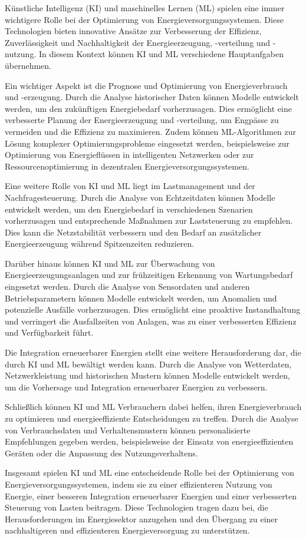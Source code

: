 Künstliche Intelligenz (KI) und maschinelles Lernen (ML) spielen eine immer
wichtigere Rolle bei der Optimierung von Energieversorgungssystemen. Diese
Technologien bieten innovative Ansätze zur Verbesserung der Effizienz,
Zuverlässigkeit und Nachhaltigkeit der Energieerzeugung, -verteilung und
-nutzung. In diesem Kontext können KI und ML verschiedene Hauptaufgaben
übernehmen.

Ein wichtiger Aspekt ist die Prognose und Optimierung von Energieverbrauch und
-erzeugung. Durch die Analyse historischer Daten können Modelle entwickelt
werden, um den zukünftigen Energiebedarf vorherzusagen. Dies ermöglicht eine
verbesserte Planung der Energieerzeugung und -verteilung, um Engpässe zu
vermeiden und die Effizienz zu maximieren. Zudem können ML-Algorithmen zur
Lösung komplexer Optimierungsprobleme eingesetzt werden, beispielsweise zur
Optimierung von Energieflüssen in intelligenten Netzwerken oder zur
Ressourcenoptimierung in dezentralen Energieversorgungssystemen.

Eine weitere Rolle von KI und ML liegt im Lastmanagement und der
Nachfragesteuerung. Durch die Analyse von Echtzeitdaten können Modelle
entwickelt werden, um den Energiebedarf in verschiedenen Szenarien
vorherzusagen und entsprechende Maßnahmen zur Laststeuerung zu empfehlen. Dies
kann die Netzstabilität verbessern und den Bedarf an zusätzlicher
Energieerzeugung während Spitzenzeiten reduzieren.

Darüber hinaus können KI und ML zur Überwachung von Energieerzeugungsanlagen
und zur frühzeitigen Erkennung von Wartungsbedarf eingesetzt werden. Durch die
Analyse von Sensordaten und anderen Betriebsparametern können Modelle
entwickelt werden, um Anomalien und potenzielle Ausfälle vorherzusagen. Dies
ermöglicht eine proaktive Instandhaltung und verringert die Ausfallzeiten von
Anlagen, was zu einer verbesserten Effizienz und Verfügbarkeit führt.

Die Integration erneuerbarer Energien stellt eine weitere Herausforderung dar,
die durch KI und ML bewältigt werden kann. Durch die Analyse von Wetterdaten,
Netzwerkleistung und historischen Mustern können Modelle entwickelt werden, um
die Vorhersage und Integration erneuerbarer Energien zu verbessern.

Schließlich können KI und ML Verbrauchern dabei helfen, ihren Energieverbrauch
zu optimieren und energieeffiziente Entscheidungen zu treffen. Durch die
Analyse von Verbrauchsdaten und Verhaltensmustern können personalisierte
Empfehlungen gegeben werden, beispielsweise der Einsatz von energieeffizienten
Geräten oder die Anpassung des Nutzungsverhaltens.

Insgesamt spielen KI und ML eine entscheidende Rolle bei der Optimierung von
Energieversorgungssystemen, indem sie zu einer effizienteren Nutzung von
Energie, einer besseren Integration erneuerbarer Energien und einer
verbesserten Steuerung von Lasten beitragen. Diese Technologien tragen dazu
bei, die Herausforderungen im Energiesektor anzugehen und den Übergang zu einer
nachhaltigeren und effizienteren Energieversorgung zu unterstützen.